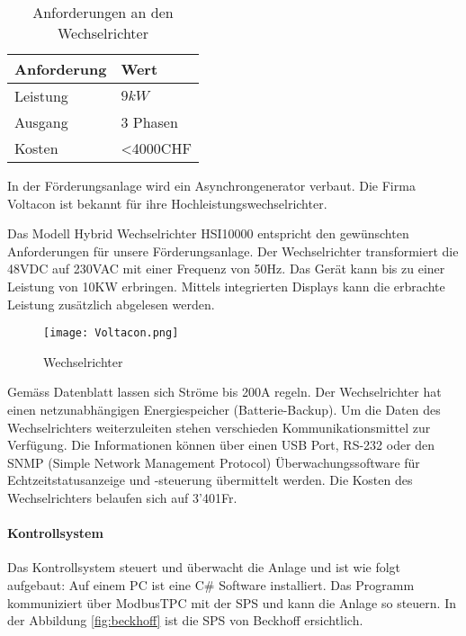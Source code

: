 \begin{table}[H]
\small
\begin{center}
\begin{tabular}{ll}
\hline
\textbf{Anforderung}&\textbf{Wert}\\
\hline
Leistung&\(9 kW\)\\
Ausgang&3 Phasen\\
Kosten&<4000CHF\\
\hline
\end{tabular}
\caption{Anforderungen an den Wechselrichter}
\end{center}
\end{table}

In der Förderungsanlage wird ein Asynchrongenerator verbaut. Die Firma Voltacon ist bekannt für ihre Hochleistungswechselrichter.

Das Modell Hybrid Wechselrichter HSI10000 entspricht den gewünschten Anforderungen für unsere Förderungsanlage. Der Wechselrichter transformiert die 48VDC auf 230VAC mit einer Frequenz von 50\si{\hertz}. Das Gerät kann bis zu einer Leistung von 10KW erbringen. Mittels integrierten Displays kann die erbrachte Leistung zusätzlich abgelesen werden. 


\begin{figure} [H]
	\centering
	\texttt{[image: Voltacon.png]}
	\caption{Wechselrichter \cite{Voltaconsolar}}
	\label{fig:Wechselrichter}
\end{figure}

Gemäss Datenblatt lassen sich Ströme bis 200A regeln. Der Wechselrichter hat einen netzunabhängigen Energiespeicher (Batterie-Backup). Um die Daten des Wechselrichters weiterzuleiten stehen verschieden Kommunikationsmittel zur Verfügung. Die Informationen können über einen USB Port, RS-232 oder den SNMP (Simple Network Management Protocol) Überwachungssoftware für Echtzeitstatusanzeige und -steuerung übermittelt werden. Die Kosten des Wechselrichters belaufen sich auf 3'401\si{Fr}.

\newpage


\paragraph{Kontrollsystem}

Das Kontrollsystem steuert und überwacht die Anlage und ist wie folgt aufgebaut: Auf einem PC ist eine C\# Software installiert. Das Programm kommuniziert über ModbusTPC mit der SPS und kann die Anlage so steuern. In der Abbildung \ref{fig:beckhoff}  ist die SPS von Beckhoff ersichtlich.

